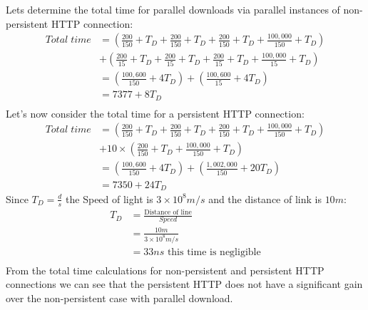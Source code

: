 \documentclass{article}
\begin{document}
\smallskip
Lets determine the total time for parallel downloads via parallel instances of non-persistent HTTP connection:
\begin{equation*}
    \begin{split}
        Total \; time &= (\frac{200}{150}+T_D+\frac{200}{150}+T_D+\frac{200}{150}+T_D+\frac{100,000}{150}+T_D)\\
        &+(\frac{200}{15}+T_D+\frac{200}{15}+T_D+\frac{200}{15}+T_D+\frac{100,000}{15}+T_D)\\
        &= (\frac{100,600}{150}+4T_D)+(\frac{100,600}{15}+4T_D)\\
        &= 7377+8T_D\\
    \end{split}
\end{equation*}
Let's now consider the total time for a persistent HTTP connection:
\begin{equation*}
    \begin{split}
        Total \; time &= (\frac{200}{150}+T_D+\frac{200}{150}+T_D+\frac{200}{150}+T_D+\frac{100,000}{150}+T_D)\\
        &+ 10 \times (\frac{200}{150}+T_D+\frac{100,000}{150}+T_D)\\
        &= (\frac{100,600}{150}+4T_D)+(\frac{1,002,000}{150}+20T_D)\\
        &= 7350+24T_D
    \end{split}
\end{equation*}
Since $T_D=\frac{d}{s}$ the Speed of light is $3 \times 10^8m/s$ and the distance of link is $10m$:
\begin{equation*}
    \begin{split}
        T_D &= \frac{\text{Distance of line}}{Speed}\\
        &= \frac{10m}{3 \times 10^8m/s}\\
        &= 33ns \text{ this time is negligible}\\
    \end{split}
\end{equation*}
From the total time calculations for non-persistent and persistent HTTP connections we can see that the persistent HTTP does not have a significant gain over the non-persistent case with parallel download.
\end{document}
